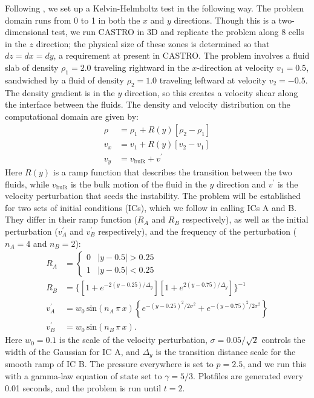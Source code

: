 \documentclass{emulateapj}
\begin{document}
Following \cite{robertson:2010}, we set up a Kelvin-Helmholtz test in
the following way. The problem domain runs from 0 to 1 in both the $x$
and $y$ directions. Though this is a two-dimensional test, we run
CASTRO in 3D and replicate the problem along 8 cells in the $z$
direction; the physical size of these zones is determined so that $dz
= dx = dy$, a requirement at present in CASTRO. The problem involves a
fluid slab of density $\rho_1 = 2.0$ traveling rightward in the
$x$-direction at velocity $v_1 = 0.5$, sandwiched by a fluid of
density $\rho_2 = 1.0$ traveling leftward at velocity $v_2 =
-0.5$. The density gradient is in the $y$ direction, so this creates a
velocity shear along the interface between the fluids. The density and
velocity distribution on the computational domain are given by:
\begin{align}
  \rho &= \rho_1 + R(y)\left[\rho_2 - \rho_1\right] \\
  v_x  &= v_1 + R(y)\left[v_2 - v_1\right] \\
  v_y  &= v_{\text{bulk}} + v^\prime
\end{align}
Here $R(y)$ is a ramp function that describes the transition between
the two fluids, while $v_{\text{bulk}}$ is the bulk motion of the
fluid in the $y$ direction and $v^\prime$ is the velocity perturbation
that seeds the instability. The problem will be established for two
sets of initial conditions (ICs), which we follow
\citeauthor{robertson:2010} in calling ICs A and B. They differ in
their ramp function ($R_A$ and $R_B$ respectively), as well as the
initial perturbation ($v^\prime_A$ and $v^\prime_B$ respectively), and
the frequency of the perturbation ($n_A = 4$ and $n_B = 2$):
\begin{align}
  R_A &= \begin{cases} 0 & |y - 0.5| > 0.25 \\ 1 & |y - 0.5| < 0.25 \end{cases} \\
  R_B &= \Big\{\left[1 + e^{-2(y-0.25)/\Delta_y}\right]\left[1 + e^{2(y-0.75)/\Delta_y}\right]\Big\}^{-1} \\
  v^\prime_A &= w_0\, \text{sin}\left(n_A\, \pi\, x\right) \left\{e^{-(y-0.25)^2 / 2\sigma^2} + e^{-(y-0.75)^2/2\sigma^2}\right\} \\
  v^\prime_B &= w_0\, \text{sin}\left(n_B\, \pi\, x\right).
\end{align}
Here $w_0 = 0.1$ is the scale of the velocity perturbation, $\sigma =
0.05/\sqrt{2}$ controls the width of the Gaussian for IC A, and
$\Delta_y$ is the transition distance scale for the smooth ramp of IC
B. The pressure everywhere is set to $p = 2.5$, and we run this with a
gamma-law equation of state set to $\gamma = 5/3$. Plotfiles are
generated every 0.01 seconds, and the problem is run until $t = 2$.
\end{document}
